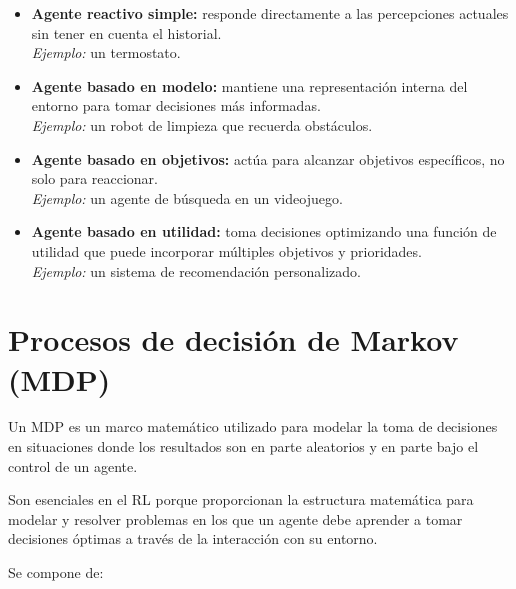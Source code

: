 \begin{itemize}
    \item \textbf{Agente reactivo simple:} responde directamente a las percepciones actuales sin tener en cuenta el historial. \\
    \textit{Ejemplo:} un termostato.
    
    \item \textbf{Agente basado en modelo:} mantiene una representación interna del entorno para tomar decisiones más informadas. \\
    \textit{Ejemplo:} un robot de limpieza que recuerda obstáculos.

    \item \textbf{Agente basado en objetivos:} actúa para alcanzar objetivos específicos, no solo para reaccionar. \\
    \textit{Ejemplo:} un agente de búsqueda en un videojuego.

    \item \textbf{Agente basado en utilidad:} toma decisiones optimizando una función de utilidad que puede incorporar múltiples objetivos y prioridades. \\
    \textit{Ejemplo:} un sistema de recomendación personalizado.
\end{itemize}

\section{Procesos de decisión de Markov (MDP)}

Un MDP es un marco matemático utilizado para modelar la toma de decisiones en situaciones donde los resultados son en parte aleatorios y en parte bajo el control de un agente.

Son esenciales en el RL porque proporcionan la estructura matemática para modelar y resolver problemas en los que un agente debe aprender a tomar decisiones óptimas a través de la interacción con su entorno.

Se compone de:

